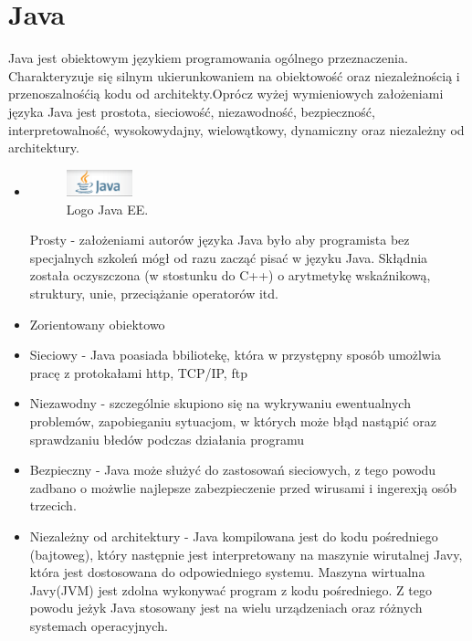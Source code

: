 \documentclass[eng,printmode,oneside]{mgr}
\begin{document}
\section{Java}

Java jest obiektowym językiem programowania ogólnego przeznaczenia.
Charakteryzuje się silnym ukierunkowaniem na obiektowość oraz niezależnością i
przenoszalnośćią kodu od architekty.Oprócz wyżej wymieniowych założeniami języka
Java jest prostota, sieciowość, niezawodność, bezpieczność, interpretowalność, wysokowydajny,
wielowątkowy, dynamiczny oraz niezależny od architektury. 

\begin{itemize}
  \item  \parbox[t]{\dimexpr\textwidth-\leftmargin}{
      \vspace{-2.5mm}
    \begin{figure}
	\centering
	\includegraphics[width=0.18\textwidth]{javaEE.png}
	\caption{\label{javaEE}Logo Java EE.}
	\end{figure}
  Prosty - założeniami autorów języka Java było aby programista bez
  specjalnych szkoleń mógł od razu zacząć pisać w języku Java. Skłądnia została
  oczyszczona (w stostunku do C++) o arytmetykę wskaźnikową, struktury, unie,
  przeciążanie operatorów itd. 
	}
  \item Zorientowany obiektowo
  \item Sieciowy - Java poasiada bbiliotekę, która w przystępny sposób umożlwia
  pracę z protokałami http, TCP/IP, ftp
  \item Niezawodny - szczególnie skupiono się na wykrywaniu ewentualnych
  problemów, zapobieganiu sytuacjom, w których może błąd nastąpić oraz
  sprawdzaniu błedów podczas działania programu
  \item Bezpieczny - Java może służyć do zastosowań sieciowych, z tego powodu
  zadbano o możwlie najlepsze zabezpieczenie przed wirusami i ingerexją osób
  trzecich.
  \item Niezależny od architektury - Java kompilowana jest do kodu pośredniego
  (bajtoweg), który następnie jest interpretowany na maszynie wirutalnej Javy,
  która jest dostosowana do odpowiedniego systemu. Maszyna wirtualna Javy(JVM)
  jest zdolna wykonywać program z kodu pośredniego. Z tego powodu jeżyk Java
  stosowany jest na wielu urządzeniach oraz różnych systemach operacyjnych.

\end{itemize}
\end{document}
